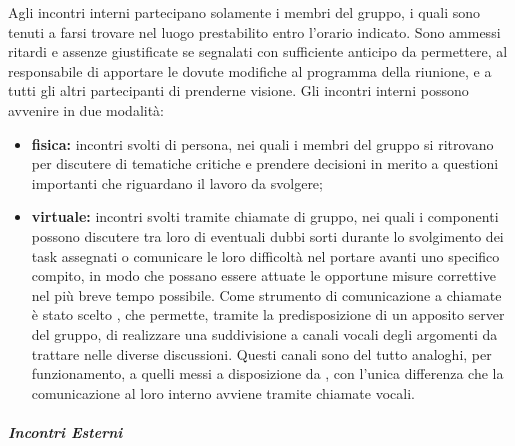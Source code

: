 				Agli incontri interni partecipano solamente i membri del gruppo, i quali sono tenuti a farsi trovare nel luogo prestabilito entro l'orario indicato.
				\newline
				Sono ammessi ritardi e assenze giustificate se segnalati con sufficiente anticipo da permettere, al responsabile di apportare le dovute modifiche al programma della riunione, e a tutti gli altri partecipanti di prenderne visione.
				\newline
				Gli incontri interni possono avvenire in due modalità:
				\begin{itemize}
					\item \textbf{fisica:} incontri svolti di persona, nei quali i membri del gruppo si ritrovano per discutere di tematiche critiche e prendere decisioni in merito a questioni importanti che riguardano il lavoro da svolgere;
					\item \textbf{virtuale:} incontri svolti tramite chiamate di gruppo, nei quali i componenti possono discutere tra loro di eventuali dubbi sorti durante lo svolgimento dei task assegnati o comunicare le loro difficoltà nel portare avanti uno specifico compito, in modo che possano essere attuate le opportune misure correttive nel più breve tempo possibile.
					\newline
					Come strumento di comunicazione a chiamate è stato scelto , che permette, tramite la predisposizione di un apposito server del gruppo, di realizzare una suddivisione a canali vocali degli argomenti da trattare nelle diverse discussioni. Questi canali sono del tutto analoghi, per funzionamento, a quelli messi a disposizione da , con l'unica differenza che la comunicazione al loro interno avviene tramite chiamate vocali.
				\end{itemize}
			
			\subparagraph{Incontri Esterni}
			
